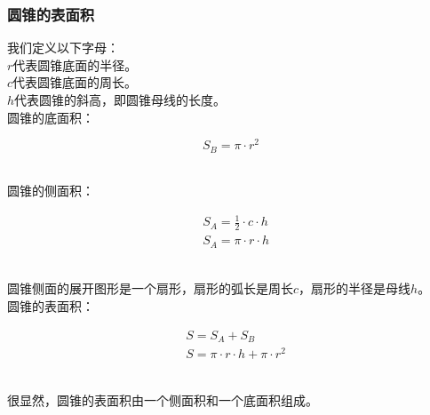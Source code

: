 \documentclass[UTF8]{ctexart}
\begin{document}
\subsubsection{圆锥的表面积}
    我们定义以下字母：\\[3mm]
    $r$代表圆锥底面的半径。\\[3mm]
    $c$代表圆锥底面的周长。\\[3mm]
    $h$代表圆锥的斜高，即圆锥母线的长度。\\[6mm]
    圆锥的底面积：
    \begin{large}
        \begin{equation*}
            S_B=\pi\cdot r^2
        \end{equation*}
    \end{large}\\
    圆锥的侧面积：
    \begin{large}
        \begin{align*}
            &S_A=\frac{1}{2}\cdot c\cdot h\\[3mm]
            &S_A=\pi\cdot r\cdot h
        \end{align*}
    \end{large}\\
    圆锥侧面的展开图形是一个扇形，扇形的弧长是周长$c$，扇形的半径是母线$h$。\\[8mm]
    圆锥的表面积：
    \begin{large}
        \begin{align*}
            &S=S_A+S_B\\[3mm]
            &S=\pi\cdot r\cdot h+\pi\cdot r^2
        \end{align*}
    \end{large}\\
    很显然，圆锥的表面积由一个侧面积和一个底面积组成。    

\newpage
\end{document}
